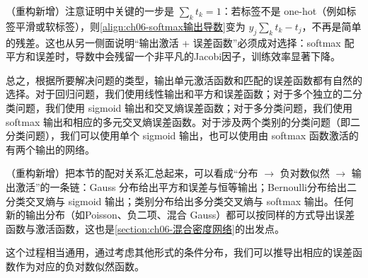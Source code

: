 \documentclass[../../main.tex]{subfiles}
\begin{document}
\begin{remark}（重构新增）注意证明中关键的一步是 $\sum_kt_k=1$：若标签不是 one-hot（例如标签平滑或软标签），则\eqref{align:ch06-softmax输出导数}变为 $y_j\sum_kt_k-t_j$，不再是简单的残差。这也从另一侧面说明“输出激活 + 误差函数”必须成对选择：softmax 配平方和误差时，导数中会残留一个非平凡的Jacobi因子，训练效率显著下降。
\end{remark}

总之，根据所要解决问题的类型，输出单元激活函数和匹配的误差函数都有自然的选择。对于回归问题，我们使用线性输出和平方和误差函数；对于多个独立的二分类问题，我们使用 sigmoid 输出和交叉熵误差函数；对于多分类问题，我们使用 softmax 输出和相应的多元交叉熵误差函数。对于涉及两个类别的分类问题（即二分类问题），我们可以使用单个 sigmoid 输出，也可以使用由 softmax 函数激活的有两个输出的网络。

\begin{remark}（重构新增）把本节的配对关系汇总起来，可以看成“分布 $\to$ 负对数似然 $\to$ 输出激活”的一条链：Gauss 分布给出平方和误差与恒等输出；Bernoulli分布给出二分类交叉熵与 sigmoid 输出；类别分布给出多分类交叉熵与 softmax 输出。任何新的输出分布（如Poisson、负二项、混合 Gauss）都可以按同样的方式导出误差函数与激活函数，这也是\cref{section:ch06-混合密度网络}的出发点。
\end{remark}

这个过程相当通用，通过考虑其他形式的条件分布，我们可以推导出相应的误差函数作为对应的负对数似然函数。
\end{document}
